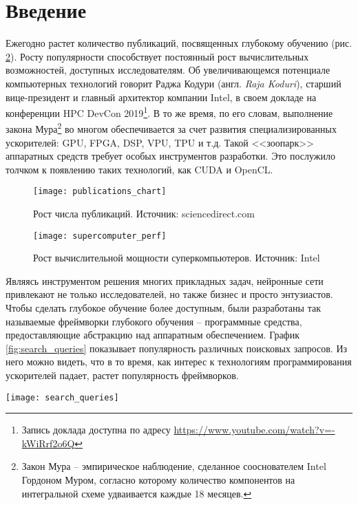 \clearpage
\section{Введение}

Ежегодно растет количество публикаций, посвященных глубокому обучению (рис.
\ref{fig:publications}). Росту популярности способствует постоянный рост
вычислительных возможностей, доступных исследователям. Об увеличивающемся
потенциале компьютерных технологий говорит Раджа Кодури (англ. 
\textit{Raja Koduri}), старший вице-президент и главный архитектор компании
Intel, в своем докладе на конференции HPC DevCon 2019\footnote{Запись доклада
доступна по адресу \url{https://www.youtube.com/watch?v=-kWiRrf2o6Q}}.
В то же время, по его словам, выполнение закона Мура\footnote{Закон Мура -- 
эмпирическое наблюдение, сделанное сооснователем Intel Гордоном Муром, согласно
которому количество компонентов на интегральной схеме удваивается каждые 18
месяцев.} во многом обеспечивается за счет развития специализированных
ускорителей: GPU, FPGA, DSP, VPU, TPU и т.д. Такой <<зоопарк>> аппаратных
средств требует особых инструментов разработки. Это послужило толчком к появлению
таких технологий, как CUDA и OpenCL.
\begin{figure}[h]
\centering
\texttt{[image: publications\_chart]}
\caption{Рост числа публикаций. Источник: sciencedirect.com}
\label{fig:publications}
\end{figure}
\begin{figure}[h]
\centering
\texttt{[image: supercomputer\_perf]}
\caption{Рост вычислительной мощности суперкомпьютеров. Источник: Intel}
\label{fig:publications}
\end{figure}

Являясь инструментом решения многих прикладных задач, нейронные сети привлекают
не только исследователей, но также бизнес и просто энтузиастов. Чтобы сделать
глубокое обучение более доступным, были разработаны так называемые фреймворки
глубокого обучения -- программные средства, предоставляющие абстракцию над
аппаратным обеспечением. График \ref{fig:search_queries} показывает популярность
различных поисковых запросов. Из него можно видеть, что в то время, как интерес
к технологиям программирования ускорителей падает, растет популярность
фреймворков.
\begin{sidewaysfigure}
\centering
\texttt{[image: search\_queries]}
\caption{Динамика популярности поисковых запросов}
\label{fig:search_queries}
\end{sidewaysfigure}

